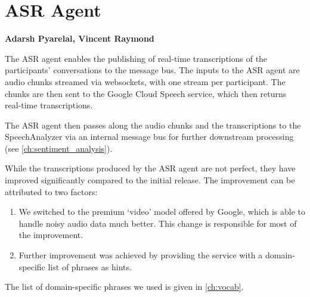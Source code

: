 \chapter{ASR Agent}
\label{ch:asr}
\textbf{Adarsh Pyarelal, Vincent Raymond}

\bigskip

The ASR agent enables the publishing of real-time transcriptions of the
participants' conversations to the message bus. The inputs to the ASR agent are
audio chunks streamed via websockets, with one stream per participant. The
chunks are then sent to the Google Cloud Speech service, which then returns
real-time transcriptions.

The ASR agent then passes along the audio chunks and the transcriptions to the
SpeechAnalyzer via an internal message bus for further downstream processing
(see \autoref{ch:sentiment_analysis}).

While the transcriptions produced by the ASR agent are not perfect, they have
improved significantly compared to the initial release. The improvement can be
attributed to two factors:

\begin{enumerate}
    \item We switched to the premium `video' model offered by Google, which is
        able to handle noisy audio data much better. This change is responsible
        for most of the improvement.
    \item Further improvement was achieved by providing the service with a
        domain-specific list of phrases as hints.
\end{enumerate}

The list of domain-specific phrases we used is given in \autoref{ch:vocab}.
